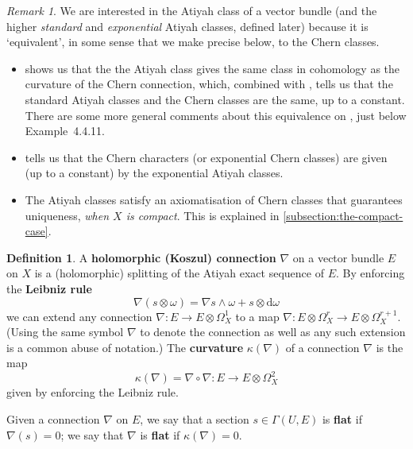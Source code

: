 \documentclass[11pt,fleqn]{article}
\theoremstyle{plain}
\theoremstyle{definition}
\newtheorem{definition}[theorem]{Definition}
\theoremstyle{remark}
\newtheorem{remark}[theorem]{Remark}
\numberwithin{equation}{theorem}
\newcommand{\define}[1]{\textbf{#1}}
\renewcommand{\d}{\mathrm{d}}
\begin{document}
        \begin{remark}
            We are interested in the Atiyah class of a vector bundle (and the higher \emph{standard} and \emph{exponential} Atiyah classes, defined later) because it is `equivalent', in some sense that we make precise below, to the Chern classes.
            \begin{itemize}
                \item \cite[Proposition~4.3.10]{Huybrechts2005} shows us that the the Atiyah class gives the same class in cohomology as the curvature of the Chern connection, which, combined with \cite[Example~4.4.8~i)]{Huybrechts2005}, tells us that the standard Atiyah classes and the Chern classes are the same, up to a constant.
                    There are some more general comments about this equivalence on \cite[p.~200]{Huybrechts2005}, just below Example~4.4.11.
                \item \cite[Exercise~4.4.11]{Huybrechts2005} tells us that the Chern characters (or exponential Chern classes) are given (up to a constant) by the exponential Atiyah classes.
                \item The Atiyah classes satisfy an axiomatisation of Chern classes that guarantees uniqueness, \emph{when $X$ is compact}.
                    This is explained in \cref{subsection:the-compact-case}.
            \end{itemize}
        \end{remark}

        \begin{definition}
            A \define{holomorphic (Koszul) connection} $\nabla$ on a vector bundle $E$ on $X$ is a (holomorphic) splitting of the Atiyah exact sequence of $E$.
            By enforcing the \define{Leibniz rule}
            \[
                \nabla(s\otimes\omega)
                =
                \nabla s\wedge\omega + s\otimes\d\omega
            \]
            we can extend any connection $\nabla\colon E\to E\otimes\Omega_X^1$ to a map $\nabla\colon E\otimes\Omega_X^r\to E\otimes\Omega_X^{r+1}$.
            (Using the same symbol $\nabla$ to denote the connection as well as any such extension is a common abuse of notation.)
            The \define{curvature} $\kappa(\nabla)$ of a connection $\nabla$ is the map
            \[
                \kappa(\nabla)=\nabla\circ\nabla\colon
                E\to E\otimes\Omega_X^2
            \]
            given by enforcing the Leibniz rule.

            Given a connection $\nabla$ on $E$, we say that a section $s\in\Gamma(U,E)$ is \define{flat} if $\nabla(s)=0$; we say that $\nabla$ is \define{flat} if $\kappa(\nabla)=0$.
        \end{definition}
\end{document}
